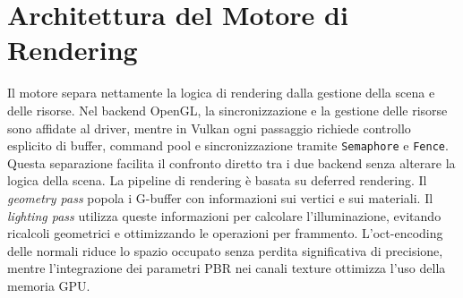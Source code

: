 \documentclass[12pt,a4paper,openright,twoside]{book}
\begin{document}
\section{Architettura del Motore di Rendering}
Il motore separa nettamente la logica di rendering dalla gestione della scena e delle risorse. Nel backend OpenGL,
la sincronizzazione e la gestione delle risorse sono affidate al driver, mentre in Vulkan ogni passaggio richiede controllo
esplicito di buffer, command pool e sincronizzazione tramite \texttt{Semaphore} e \texttt{Fence}. Questa separazione facilita
il confronto diretto tra i due backend senza alterare la logica della scena.
La pipeline di rendering è basata su deferred rendering. Il \emph{geometry pass} popola i G-buffer con informazioni sui
vertici e sui materiali. Il \emph{lighting pass} utilizza queste informazioni per calcolare l’illuminazione, evitando
ricalcoli geometrici e ottimizzando le operazioni per frammento. L'oct-encoding delle normali riduce lo spazio occupato
senza perdita significativa di precisione, mentre l’integrazione dei parametri PBR nei canali texture ottimizza l’uso
della memoria GPU.
\end{document}
